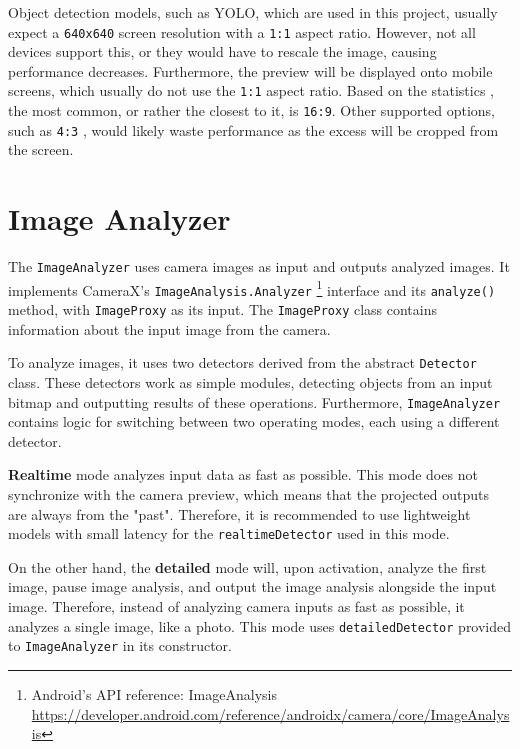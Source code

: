 Object detection models, such as YOLO, which are used in this project, usually expect a \texttt{640x640} screen resolution with a \texttt{1:1} aspect ratio. However, not all devices support this, or they would have to rescale the image, causing performance decreases. Furthermore, the preview will be displayed onto mobile screens, which usually do not use the \texttt{1:1} aspect ratio. Based on the statistics \cite{aspectRatioStats}, the most common, or rather the closest to it, is \texttt{16:9}. Other supported options, such as \texttt{4:3} , would likely waste performance as the excess will be cropped from the screen.





\section{Image Analyzer}
The \texttt{ImageAnalyzer} uses camera images as input and outputs analyzed images. It implements CameraX's \texttt{ImageAnalysis.Analyzer} \footnote{Android's API reference: ImageAnalysis \url{https://developer.android.com/reference/androidx/camera/core/ImageAnalysis}} interface and its \texttt{analyze()} method, with \texttt{ImageProxy} as its input. The \texttt{ImageProxy} class contains information about the input image from the camera.

To analyze images, it uses two detectors derived from the abstract \texttt{Detector} class. These detectors work as simple modules, detecting objects from an input bitmap and outputting results of these operations. Furthermore, \texttt{ImageAnalyzer} contains logic for switching between two operating modes, each using a different detector. 

\textbf{Realtime} mode analyzes input data as fast as possible. This mode does not synchronize with the camera preview, which means that the projected outputs are always from the "past". Therefore, it is recommended to use lightweight models with small latency for the \texttt{realtimeDetector} used in this mode.

On the other hand, the \textbf{detailed} mode will, upon activation, analyze the first image, pause image analysis, and output the image analysis alongside the input image. Therefore, instead of analyzing camera inputs as fast as possible, it analyzes a single image, like a photo. This mode uses \texttt{detailedDetector} provided to \texttt{ImageAnalyzer} in its constructor.

